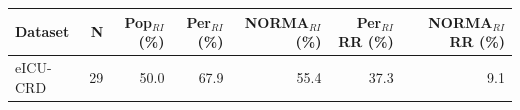 \begin{table}[ht]
\centering
\footnotesize
\begin{tabular}{lrrrrrr}
\toprule
Dataset & N & Pop$_{RI}$ (\%) & Per$_{RI}$ (\%) & NORMA$_{RI}$ (\%) & Per$_{RI}$ RR (\%) & NORMA$_{RI}$ RR (\%) \\
\midrule
eICU-CRD & 29 & 50.0 & 67.9 & 55.4 & 37.3 & 9.1 \\
\bottomrule
\end{tabular}
\label{tab:07_prevalence}
\end{table}
